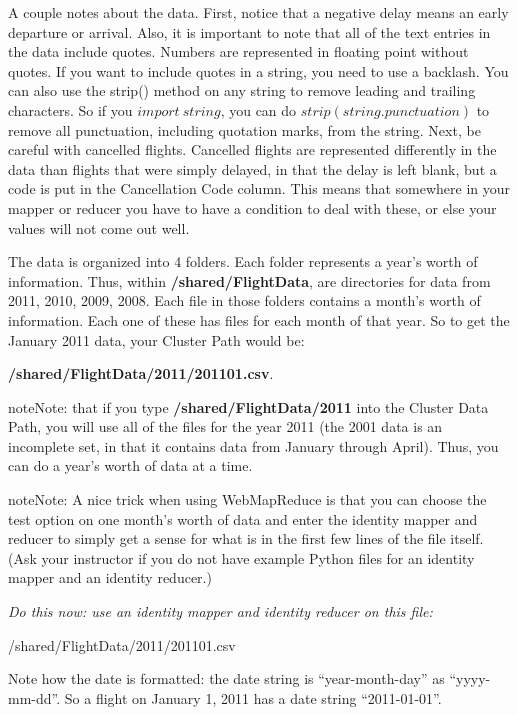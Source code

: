 \documentclass[letterpaper,10pt,openany,oneside]{sphinxmanual}
\begin{document}
A couple notes about the data. First, notice that a negative delay
means an early departure or arrival. Also, it is important to note
that all of the text entries in the data include quotes. Numbers
are represented in floating point without quotes. If you want to
include quotes in a string, you need to use a backlash. You can
also use the strip() method on any string to remove leading and
trailing characters. So if you $import \ string$, you can
do $strip(string.punctuation)$ to remove all punctuation,
including quotation marks, from the string. Next, be careful with
cancelled flights. Cancelled flights are represented differently in
the data than flights that were simply delayed, in that the delay
is left blank, but a code is put in the Cancellation Code column.
This means that somewhere in your mapper or reducer you have to
have a condition to deal with these, or else your values will not
come out well.

The data is organized into 4 folders. Each folder represents a
year's worth of information. Thus, within \textbf{/shared/FlightData}, are directories for
data from 2011, 2010, 2009, 2008. Each file in those folders
contains a month's worth of information. Each one of these has
files for each month of that year. So to get the January 2011 data,
your Cluster Path would be:

\textbf{/shared/FlightData/2011/201101.csv}.

\begin{notice}{note}{Note:}
that if you type
\textbf{/shared/FlightData/2011}
into the Cluster Data Path, you will use all of the files for the
year 2011 (the 2001 data is an incomplete set, in that it contains
data from January through April). Thus, you can do a year's worth
of data at a time.
\end{notice}

\begin{notice}{note}{Note:}
A nice trick when using WebMapReduce is that you can choose
the test option on one month's worth of data and enter the identity
mapper and reducer to simply get a sense for what is in the first
few lines of the file itself. (Ask your instructor if you do not
have example Python files for an identity mapper and an identity
reducer.)
\end{notice}

\emph{Do this now: use an identity mapper and identity reducer on this  file:}

/shared/FlightData/2011/201101.csv

Note how the date is formatted: the date string is ``year-month-day''
as ``yyyy-mm-dd''. So a flight on January 1, 2011 has a date string
``2011-01-01''.
\end{document}
